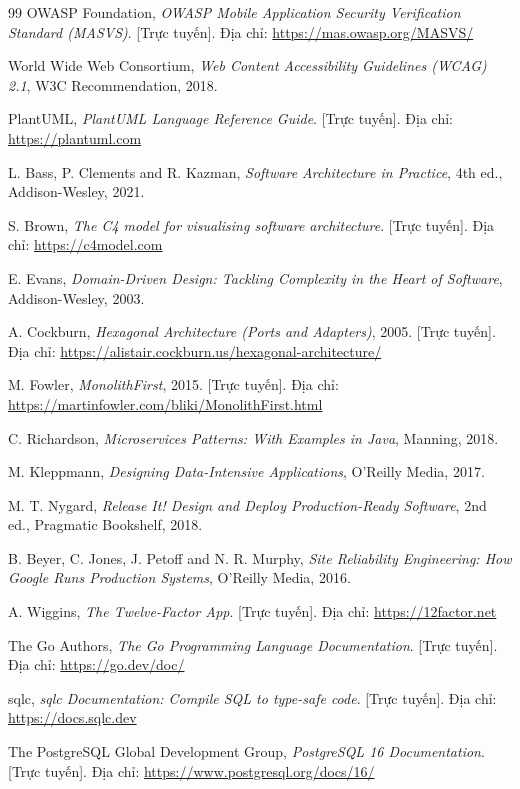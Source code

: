 \begin{thebibliography}{99}
OWASP Foundation, \emph{OWASP Mobile Application Security Verification Standard (MASVS)}. [Trực tuyến]. Địa chỉ: \url{https://mas.owasp.org/MASVS/}

World Wide Web Consortium, \emph{Web Content Accessibility Guidelines (WCAG) 2.1}, W3C Recommendation, 2018.

PlantUML, \emph{PlantUML Language Reference Guide}. [Trực tuyến]. Địa chỉ: \url{https://plantuml.com}

L. Bass, P. Clements and R. Kazman, \emph{Software Architecture in Practice}, 4th ed., Addison-Wesley, 2021.

S. Brown, \emph{The C4 model for visualising software architecture}. [Trực tuyến]. Địa chỉ: \url{https://c4model.com}

E. Evans, \emph{Domain-Driven Design: Tackling Complexity in the Heart of Software}, Addison-Wesley, 2003.

A. Cockburn, \emph{Hexagonal Architecture (Ports and Adapters)}, 2005. [Trực tuyến]. Địa chỉ: \url{https://alistair.cockburn.us/hexagonal-architecture/}

M. Fowler, \emph{MonolithFirst}, 2015. [Trực tuyến]. Địa chỉ: \url{https://martinfowler.com/bliki/MonolithFirst.html}

C. Richardson, \emph{Microservices Patterns: With Examples in Java}, Manning, 2018.

M. Kleppmann, \emph{Designing Data-Intensive Applications}, O'Reilly Media, 2017.

M. T. Nygard, \emph{Release It! Design and Deploy Production-Ready Software}, 2nd ed., Pragmatic Bookshelf, 2018.

B. Beyer, C. Jones, J. Petoff and N. R. Murphy, \emph{Site Reliability Engineering: How Google Runs Production Systems}, O'Reilly Media, 2016.

A. Wiggins, \emph{The Twelve-Factor App}. [Trực tuyến]. Địa chỉ: \url{https://12factor.net}

The Go Authors, \emph{The Go Programming Language Documentation}. [Trực tuyến]. Địa chỉ: \url{https://go.dev/doc/}

sqlc, \emph{sqlc Documentation: Compile SQL to type-safe code}. [Trực tuyến]. Địa chỉ: \url{https://docs.sqlc.dev}

The PostgreSQL Global Development Group, \emph{PostgreSQL 16 Documentation}. [Trực tuyến]. Địa chỉ: \url{https://www.postgresql.org/docs/16/}


\end{thebibliography}
